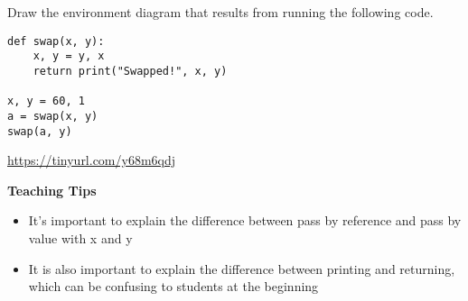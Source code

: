 \begin{blocksection}
\question Draw the environment diagram that results from running the following code.

\begin{lstlisting}
def swap(x, y):
    x, y = y, x
    return print("Swapped!", x, y)

x, y = 60, 1
a = swap(x, y)
swap(a, y)
\end{lstlisting}

\begin{solution}[2in]
\url{https://tinyurl.com/y68m6qdj}
\end{solution}
\end{blocksection}

\begin{questionmeta}
\textbf{Teaching Tips}
  \begin{itemize}
    \item It's important to explain the difference between pass by reference and pass by value with x and y
    \item It is also important to explain the difference between printing and returning, which can be confusing to students at the beginning
  \end{itemize}
\end{questionmeta}
